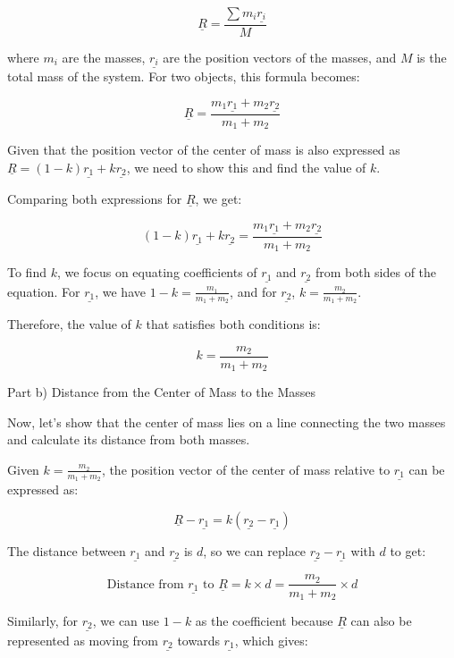 \[ \underline{R} = \frac{\sum m_i \underline{r_i}}{M} \]

where \( m_i \) are the masses, \( \underline{r_i} \) are the position vectors of the masses, and \( M \) is the total mass of the system. For two objects, this formula becomes:

\[ \underline{R} = \frac{m_1 \underline{r_1} + m_2 \underline{r_2}}{m_1 + m_2} \]

Given that the position vector of the center of mass is also expressed as \( \underline{R} = (1-k)\underline{r_{1}} + k\underline{r_{2}} \), we need to show this and find the value of \( k \).

Comparing both expressions for \( \underline{R} \), we get:

\[ (1-k)\underline{r_{1}} + k\underline{r_{2}} = \frac{m_1 \underline{r_1} + m_2 \underline{r_2}}{m_1 + m_2} \]

To find \( k \), we focus on equating coefficients of \( \underline{r_{1}} \) and \( \underline{r_{2}} \) from both sides of the equation. For \( \underline{r_{1}} \), we have \( 1-k = \frac{m_1}{m_1 + m_2} \), and for \( \underline{r_{2}} \), \( k = \frac{m_2}{m_1 + m_2} \).

Therefore, the value of \( k \) that satisfies both conditions is:

\[ k = \frac{m_2}{m_1 + m_2} \]

Part b) Distance from the Center of Mass to the Masses

Now, let's show that the center of mass lies on a line connecting the two masses and calculate its distance from both masses.

Given \( k = \frac{m_2}{m_1 + m_2} \), the position vector of the center of mass relative to \( \underline{r_{1}} \) can be expressed as:

\[ \underline{R} - \underline{r_{1}} = k(\underline{r_{2}} - \underline{r_{1}}) \]

The distance between \( \underline{r_{1}} \) and \( \underline{r_{2}} \) is \( d \), so we can replace \( \underline{r_{2}} - \underline{r_{1}} \) with \( d \) to get:

\[ \text{Distance from } \underline{r_{1}} \text{ to } \underline{R} = k \times d = \frac{m_2}{m_1 + m_2} \times d \]

Similarly, for \( \underline{r_{2}} \), we can use \( 1-k \) as the coefficient because \( \underline{R} \) can also be represented as moving from \( \underline{r_{2}} \) towards \( \underline{r_{1}} \), which gives:


